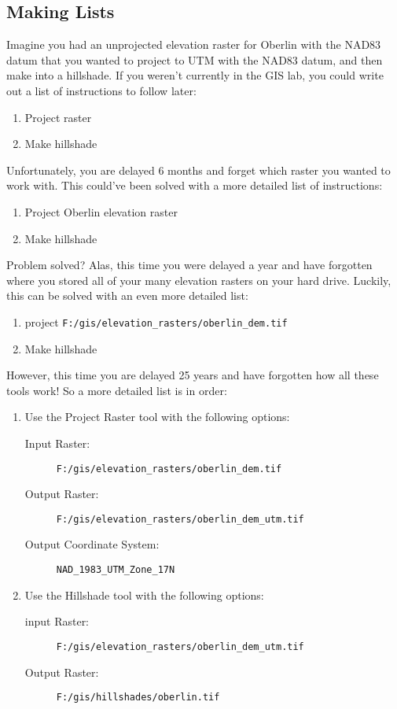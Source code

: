 \documentclass{article}
\begin{document}
\subsection{Making Lists}
Imagine you had an unprojected elevation raster for Oberlin with the NAD83  datum that you wanted to project to UTM with the NAD83 datum, and then make into a hillshade.  If you weren't currently in the GIS lab, you could write out a list of instructions to follow later:
\begin{enumerate}
    \item Project raster
    \item Make hillshade
\end{enumerate}
Unfortunately, you are delayed 6 months and forget which raster you wanted to work with.  This could've been solved with a more detailed list of instructions:
\begin{enumerate}
    \item Project Oberlin elevation raster
    \item Make hillshade
\end{enumerate}
Problem solved?  Alas, this time you were delayed a year and have forgotten where you stored all of your many elevation rasters on your hard drive.  Luckily, this can be solved with an even more detailed list:
\begin{enumerate}
    \item project \verb+F:/gis/elevation_rasters/oberlin_dem.tif+
    \item Make hillshade
\end{enumerate}
However, this time you are delayed 25 years and have forgotten how all these tools work!  So a more detailed list is in order:
\begin{enumerate}
    \item Use the Project Raster tool with the following options: 
          \begin{description}
              \item [Input Raster:] \verb+F:/gis/elevation_rasters/oberlin_dem.tif+
              \item [Output Raster:] \verb+F:/gis/elevation_rasters/oberlin_dem_utm.tif+
              \item [Output Coordinate System:] \verb+NAD_1983_UTM_Zone_17N+
          \end{description}
      \item Use the Hillshade tool with the following options:
            \begin{description}
                \item [input Raster:] \verb+F:/gis/elevation_rasters/oberlin_dem_utm.tif+
                \item [Output Raster:] \verb+F:/gis/hillshades/oberlin.tif+
            \end{description}
\end{enumerate}
\end{document}
